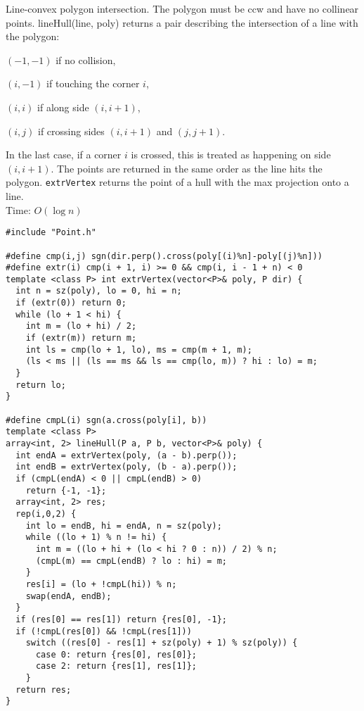 Line-convex polygon intersection. The polygon must be ccw and have no collinear points.
lineHull(line, poly) returns a pair describing the intersection of a line with the polygon:
\begin{itemize*}
\item $(-1, -1)$ if no collision,
\item $(i, -1)$ if touching the corner $i$,
\item $(i, i)$ if along side $(i, i+1)$,
\item $(i, j)$ if crossing sides $(i, i+1)$ and $(j, j+1)$.
\end{itemize*}
In the last case, if a corner $i$ is crossed, this is treated as happening on side $(i, i+1)$.
The points are returned in the same order as the line hits the polygon.
\texttt{extrVertex} returns the point of a hull with the max projection onto a line.\\
Time: $O(\log n)$
\begin{verbatim}
#include "Point.h"

#define cmp(i,j) sgn(dir.perp().cross(poly[(i)%n]-poly[(j)%n]))
#define extr(i) cmp(i + 1, i) >= 0 && cmp(i, i - 1 + n) < 0
template <class P> int extrVertex(vector<P>& poly, P dir) {
  int n = sz(poly), lo = 0, hi = n;
  if (extr(0)) return 0;
  while (lo + 1 < hi) {
    int m = (lo + hi) / 2;
    if (extr(m)) return m;
    int ls = cmp(lo + 1, lo), ms = cmp(m + 1, m);
    (ls < ms || (ls == ms && ls == cmp(lo, m)) ? hi : lo) = m;
  }
  return lo;
}

#define cmpL(i) sgn(a.cross(poly[i], b))
template <class P>
array<int, 2> lineHull(P a, P b, vector<P>& poly) {
  int endA = extrVertex(poly, (a - b).perp());
  int endB = extrVertex(poly, (b - a).perp());
  if (cmpL(endA) < 0 || cmpL(endB) > 0)
    return {-1, -1};
  array<int, 2> res;
  rep(i,0,2) {
    int lo = endB, hi = endA, n = sz(poly);
    while ((lo + 1) % n != hi) {
      int m = ((lo + hi + (lo < hi ? 0 : n)) / 2) % n;
      (cmpL(m) == cmpL(endB) ? lo : hi) = m;
    }
    res[i] = (lo + !cmpL(hi)) % n;
    swap(endA, endB);
  }
  if (res[0] == res[1]) return {res[0], -1};
  if (!cmpL(res[0]) && !cmpL(res[1]))
    switch ((res[0] - res[1] + sz(poly) + 1) % sz(poly)) {
      case 0: return {res[0], res[0]};
      case 2: return {res[1], res[1]};
    }
  return res;
}
\end{verbatim}